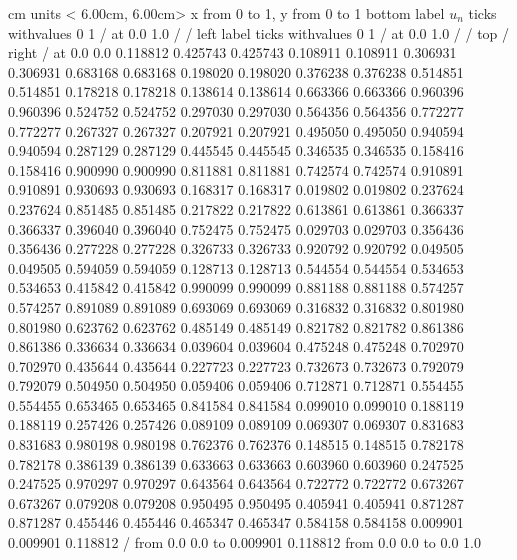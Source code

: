 \begin {center}
 cm  \beginpicture
\setcoordinatesystem units < 6.00cm, 6.00cm>
\setplotarea x from 0 to 1, y from 0 to 1
\axis bottom
  label $u_{n}$
  ticks withvalues        0        1  / at 0.0 1.0 / / 
\axis left
  label 
  ticks withvalues         0        1  / at 0.0 1.0 / / 
\axis top /  \axis right /
 at
   0.0        0.0
   0.118812   0.425743
   0.425743   0.108911
   0.108911   0.306931
   0.306931   0.683168
   0.683168   0.198020
   0.198020   0.376238
   0.376238   0.514851
   0.514851   0.178218
   0.178218   0.138614
   0.138614   0.663366
   0.663366   0.960396
   0.960396   0.524752
   0.524752   0.297030
   0.297030   0.564356
   0.564356   0.772277
   0.772277   0.267327
   0.267327   0.207921
   0.207921   0.495050
   0.495050   0.940594
   0.940594   0.287129
   0.287129   0.445545
   0.445545   0.346535
   0.346535   0.158416
   0.158416   0.900990
   0.900990   0.811881
   0.811881   0.742574
   0.742574   0.910891
   0.910891   0.930693
   0.930693   0.168317
   0.168317   0.019802
   0.019802   0.237624
   0.237624   0.851485
   0.851485   0.217822
   0.217822   0.613861
   0.613861   0.366337
   0.366337   0.396040
   0.396040   0.752475
   0.752475   0.029703
   0.029703   0.356436
   0.356436   0.277228
   0.277228   0.326733
   0.326733   0.920792
   0.920792   0.049505
   0.049505   0.594059
   0.594059   0.128713
   0.128713   0.544554
   0.544554   0.534653
   0.534653   0.415842
   0.415842   0.990099
   0.990099   0.881188
   0.881188   0.574257
   0.574257   0.891089
   0.891089   0.693069
   0.693069   0.316832
   0.316832   0.801980
   0.801980   0.623762
   0.623762   0.485149
   0.485149   0.821782
   0.821782   0.861386
   0.861386   0.336634
   0.336634   0.039604
   0.039604   0.475248
   0.475248   0.702970
   0.702970   0.435644
   0.435644   0.227723
   0.227723   0.732673
   0.732673   0.792079
   0.792079   0.504950
   0.504950   0.059406
   0.059406   0.712871
   0.712871   0.554455
   0.554455   0.653465
   0.653465   0.841584
   0.841584   0.099010
   0.099010   0.188119
   0.188119   0.257426
   0.257426   0.089109
   0.089109   0.069307
   0.069307   0.831683
   0.831683   0.980198
   0.980198   0.762376
   0.762376   0.148515
   0.148515   0.782178
   0.782178   0.386139
   0.386139   0.633663
   0.633663   0.603960
   0.603960   0.247525
   0.247525   0.970297
   0.970297   0.643564
   0.643564   0.722772
   0.722772   0.673267
   0.673267   0.079208
   0.079208   0.950495
   0.950495   0.405941
   0.405941   0.871287
   0.871287   0.455446
   0.455446   0.465347
   0.465347   0.584158
   0.584158   0.009901
   0.009901   0.118812
/
\arrow <5pt> [0.5, 1.0] from 0.0 0.0 to 0.009901 0.118812
\arrow <5pt> [0.5, 1.0] from 0.0 0.0 to 0.0 1.0 
\endpicture%
\end {center}

